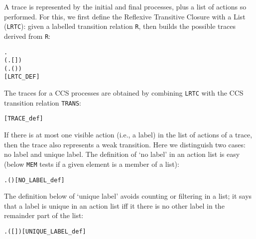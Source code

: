 A trace is represented by the initial and final processes, plus
a list of actions  so performed.
For this, we first 
 define the Reflexive Transitive Closure with a
List (\texttt{LRTC}):
given a  labelled transition relation \texttt{R}, 
then
 builds 
the possible traces derived from \texttt{R}:
\begin{alltt}
\HOLTokenTurnstile{}      \HOLSymConst{\HOLTokenEquiv{}}
   \HOLSymConst{\HOLTokenForall{}}.
       (\HOLSymConst{\HOLTokenForall{}}.   [] ) \HOLSymConst{\HOLTokenConj{}}
       (\HOLSymConst{\HOLTokenForall{}}    .     \HOLSymConst{\HOLTokenConj{}}     \HOLSymConst{\HOLTokenImp{}}   (\HOLSymConst{::}) ) \HOLSymConst{\HOLTokenImp{}}
          \hfill{[LRTC_DEF]}
\end{alltt}
The traces for a  CCS processes
are obtained
 by combining \texttt{LRTC} with the  CCS transition
relation  \texttt{TRANS}:
\begin{alltt}
 \HOLSymConst{=}  \hfill{[TRACE_def]}
\end{alltt}
If there is at most one visible action (i.e., a label) 
in the list of actions of a trace,
then the trace  also represents a weak transition. Here 
we distinguish two cases: no label and unique label. The definition of `no
label' in an action list is easy (below \texttt{MEM} 
tests if a given element is a member of a list):
\begin{alltt}
\HOLTokenTurnstile{}   \HOLSymConst{\HOLTokenEquiv{}} \HOLSymConst{\HOLTokenNeg{}}\HOLSymConst{\HOLTokenExists{}}.  ( ) \hfill{[NO_LABEL_def]}
\end{alltt}
The definition below of `unique label'
avoids counting or filtering in a list;
it says that a label is unique in an action list iff it there is no other
label in the remainder part of the list:
\begin{alltt}
\HOLTokenTurnstile{}    \HOLSymConst{\HOLTokenEquiv{}}
   \HOLSymConst{\HOLTokenExists{}} . ( \HOLSymConst{\HOLTokenDoublePlus} [] \HOLSymConst{\HOLTokenDoublePlus}  \HOLSymConst{=} ) \HOLSymConst{\HOLTokenConj{}}   \HOLSymConst{\HOLTokenConj{}}  \hfill{[UNIQUE_LABEL_def]}
\end{alltt}

